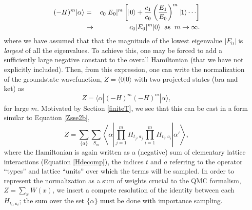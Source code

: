 \documentclass[vecphys]{svmult}
\begin{document}
\begin{eqnarray}
(-H)^m |\alpha \rangle &=& c_0|E_0|^m \left[{  |0 \rangle + \frac{c_1}{c_0} \left({ \frac{E_1}{E_0} }\right)^m|1 \rangle \cdots  }\right] \\
&\rightarrow& c_0|E_0|^m |0 \rangle \hspace{2mm} {\rm as} \hspace{2mm} m \rightarrow \infty. \nonumber
\end{eqnarray}
where we have assumed that that the magnitude of the lowest eigenvalue $|E_0|$ is {\it largest} of all the eigenvalues.  To achieve this, one may be forced to add a sufficiently large negative constant to the overall Hamiltonian (that we have not explicitly included).
Then, from this expression, one can write the normalization of the groundstate wavefunction, $Z=\langle 0 | 0 \rangle$ with two projected states (bra and ket) as
\begin{equation}
Z = \langle \alpha | (-H)^m (-H)^m | \alpha \rangle, \label{normZ2}
\end{equation}
for large $m$.  Motivated by Section \ref{finiteT}, we see that this can be cast in a form similar to Equation \ref{Zsse2b},
\begin{equation}
Z=\sum_{ \{ \alpha\} } \sum_{S_m} 
 \left\langle{\alpha  \left| \prod_{j=1}^{m} {H_{t_j,a_j}}   \prod_{i=1}^{m} {H_{t_i,a_i}} \right| \alpha'   }\right\rangle,
 \label{Zproj2b}
\end{equation}
where the Hamiltonian is again written as a (negative) sum of elementary lattice interactions (Equation \ref{Hdecomp}), the indices $t$ and $a$ referring to the operator ``types'' and lattice ``units'' over which the terms will be sampled.  
In order to represent the normalization as a sum of weights crucial to the QMC formalism, $Z = \sum_x W(x)$, we insert a compete resolution of the identity between each $H_{t_i,a_i}$; the sum over the set $\{ \alpha \}$ must be done with importance sampling. 
\end{document}
